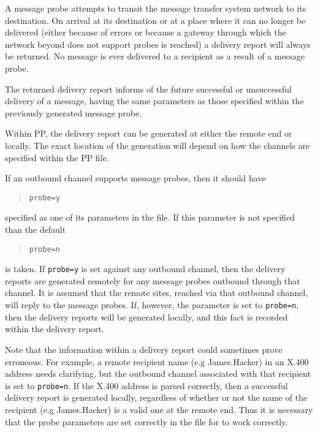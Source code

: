 A message probe attempts to transit the message transfer system
network to its destination. On arrival at its destination or at a
place where it can no longer be delivered (either because of errors or
because a gateway through which the network beyond does not support
probes is reached) a delivery report will always be returned.  No
message is ever delivered to a recipient as a result of a message
probe.

The returned delivery report informs of the future successful or
unsuccessful delivery of a message, having the same parameters as
those specified within the previously generated message probe.

Within PP, the delivery report can be generated at either the remote
end or locally.  The exact location of the generation will depend on
how the channels are specified within the PP  file.

If an outbound channel supports message probes, then it should have 
\begin{quote}\small\begin{verbatim}
probe=y
\end{verbatim}\end{quote}
specified as one of its parameters in the 
 file. If this parameter is not specified than the 
default
\begin{quote}\small\begin{verbatim}
probe=n
\end{verbatim}\end{quote}
is taken. If \verb|probe=y| is set against any 
outbound channel, then the delivery reports are generated remotely
for any message probes outbound through that channel.
It is assumed that the remote sites, reached 
via that outbound channel, will reply to the message probes.
If, however, the parameter is set to \verb|probe=n|, then the 
delivery reports will be generated locally, and this fact is 
recorded within the delivery report.

Note that the information within a delivery report could sometimes
prove erroneous.  For example, a remote recipient name (e.g James.Hacker)
in an X.400 address needs clarifying, but the outbound channel
associated with that recipient is set to \verb|probe=n|.  If the X.400
address is parsed correctly, then a successful delivery report is
generated locally, regardless of whether or not the name of the
recipient (e.g James.Hacker) is a valid one at the remote end.  Thus
it is necessary that the probe parameters are set correctly in the
 file for  to work correctly.


